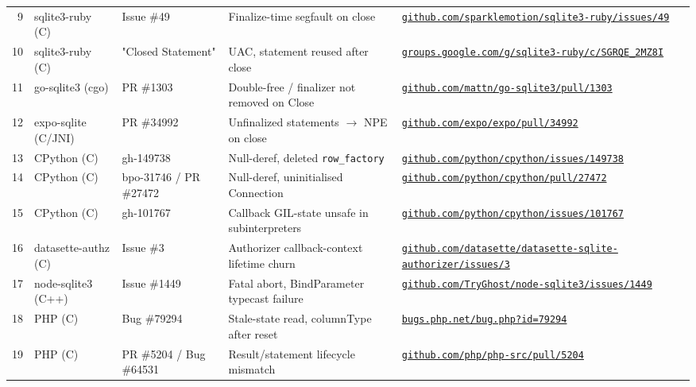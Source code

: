 \documentclass[10pt,twocolumn]{article}
\begin{document}
\begin{table}[t]
\begin{tabular}{@{}r p{2.0cm} p{2.0cm} p{4.0cm} l@{}}
9  & sqlite3-ruby (C)   & Issue \#49                & Finalize-time segfault on close              & \href{https://github.com/sparklemotion/sqlite3-ruby/issues/49}{\nolinkurl{github.com/sparklemotion/sqlite3-ruby/issues/49}} \\
10 & sqlite3-ruby (C)   & "Closed Statement"        & UAC, statement reused after close            & \href{https://groups.google.com/g/sqlite3-ruby/c/SGRQE_2MZ8I}{\nolinkurl{groups.google.com/g/sqlite3-ruby/c/SGRQE_2MZ8I}} \\
11 & go-sqlite3 (cgo)   & PR \#1303                 & Double-free / finalizer not removed on Close & \href{https://github.com/mattn/go-sqlite3/pull/1303}{\nolinkurl{github.com/mattn/go-sqlite3/pull/1303}} \\
12 & expo-sqlite (C/JNI)& PR \#34992                & Unfinalized statements $\rightarrow$ NPE on close & \href{https://github.com/expo/expo/pull/34992}{\nolinkurl{github.com/expo/expo/pull/34992}} \\
13 & CPython (C)        & gh-149738                 & Null-deref, deleted \texttt{row\_factory}     & \href{https://github.com/python/cpython/issues/149738}{\nolinkurl{github.com/python/cpython/issues/149738}} \\
14 & CPython (C)        & bpo-31746 / PR \#27472    & Null-deref, uninitialised Connection         & \href{https://github.com/python/cpython/pull/27472}{\nolinkurl{github.com/python/cpython/pull/27472}} \\
15 & CPython (C)        & gh-101767                 & Callback GIL-state unsafe in subinterpreters & \href{https://github.com/python/cpython/issues/101767}{\nolinkurl{github.com/python/cpython/issues/101767}} \\
16 & datasette-authz (C)& Issue \#3                 & Authorizer callback-context lifetime churn   & \href{https://github.com/datasette/datasette-sqlite-authorizer/issues/3}{\nolinkurl{github.com/datasette/datasette-sqlite-authorizer/issues/3}} \\
17 & node-sqlite3 (C++) & Issue \#1449              & Fatal abort, BindParameter typecast failure  & \href{https://github.com/TryGhost/node-sqlite3/issues/1449}{\nolinkurl{github.com/TryGhost/node-sqlite3/issues/1449}} \\
18 & PHP (C)            & Bug \#79294               & Stale-state read, columnType after reset     & \href{https://bugs.php.net/bug.php?id=79294}{\nolinkurl{bugs.php.net/bug.php?id=79294}} \\
19 & PHP (C)            & PR \#5204 / Bug \#64531   & Result/statement lifecycle mismatch          & \href{https://github.com/php/php-src/pull/5204}{\nolinkurl{github.com/php/php-src/pull/5204}} \\
\bottomrule
\end{tabular}
\end{table}
\end{document}
